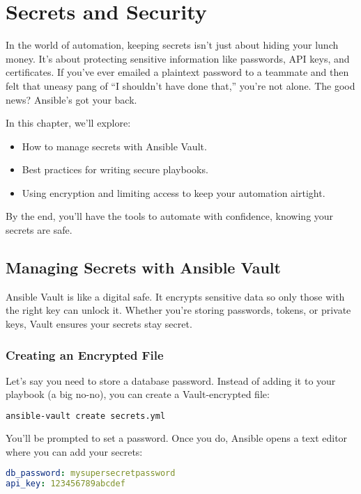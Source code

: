 \chapter{Secrets and Security}

In the world of automation, keeping secrets isn't just about hiding your lunch money. It's about protecting sensitive information like passwords, API keys, and certificates. If you've ever emailed a plaintext password to a teammate and then felt that uneasy pang of “I shouldn't have done that,” you're not alone. The good news? Ansible's got your back.

In this chapter, we'll explore:
\begin{itemize}
    \item How to manage secrets with Ansible Vault.
    \item Best practices for writing secure playbooks.
    \item Using encryption and limiting access to keep your automation airtight.
\end{itemize}

By the end, you'll have the tools to automate with confidence, knowing your secrets are safe.


\section{Managing Secrets with Ansible Vault}

Ansible Vault is like a digital safe. It encrypts sensitive data so only those with the right key can unlock it. Whether you're storing passwords, tokens, or private keys, Vault ensures your secrets stay secret.

\subsection{Creating an Encrypted File}

Let's say you need to store a database password. Instead of adding it to your playbook (a big no-no), you can create a Vault-encrypted file:
\begin{lstlisting}[language=bash, caption=Creating a Vault File]
ansible-vault create secrets.yml
\end{lstlisting}

You'll be prompted to set a password. Once you do, Ansible opens a text editor where you can add your secrets:
\begin{lstlisting}[language=yaml, caption=Example Vault File]
db_password: mysupersecretpassword
api_key: 123456789abcdef
\end{lstlisting}

